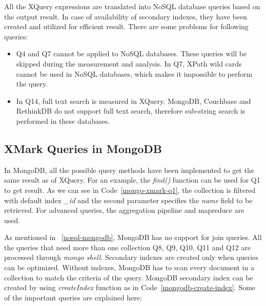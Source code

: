 All the XQuery expressions are translated into NoSQL database queries based on the output result. In case of availability of secondary indexes, they have been created and utilized for efficient result. There are some problems for following queries:
\begin{itemize}
\item Q4 and Q7 cannot be applied to NoSQL databases. These queries will be skipped during the measurement and analysis. In Q7, XPath  wild cards cannot be used in NoSQL databases, which makes it impossible to perform the query. 

\item In Q14, full text search is measured in XQuery. MongoDB, Couchbase and RethinkDB do not support full text search, therefore  sub-string search is performed in these databases. 
\end{itemize}

\subsection{XMark Queries in MongoDB}

In MongoDB, all the possible query methods have been implemented to get the same result as of XQuery.  For an example, the \textit{find()} function can be used for Q1 to get result. As we can see in  Code~\ref{mongo-xmark-q1}, the collection is filtered with default index \textit{\_id}  and the second parameter specifies the \textit{name} field to be retrieved.  For advanced queries, the aggregation pipeline and mapreduce are used. 

As mentioned in ~\ref{nosql-mongodb}, MongoDB has no support for  join queries. All the queries that need more than one collection  Q8, Q9, Q10, Q11 and Q12  are processed through \textit{mongo shell}. Secondary indexes are created only when queries can be optimized. Without indexes, MongoDB has to scan every document in a collection to match the criteria of the query. MongoDB secondary index can be created by using \textit{createIndex} function as in Code~\ref{mongodb-create-index}. Some of the important queries are explained here:

